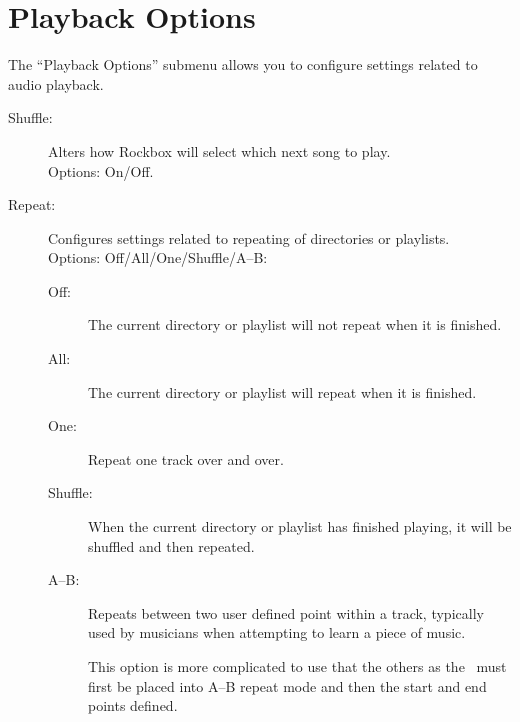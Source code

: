 \section{\label{ref:PlaybackOptions}Playback Options}
  The ``Playback Options'' submenu allows you to configure settings related to audio playback.
  \begin{description}
    \item[Shuffle: ]Alters how Rockbox will select which next song to play.\\
      Options: On/Off.
    \item[Repeat: ]Configures settings related to repeating of directories or playlists.\\
      Options: Off/All/One/Shuffle/A--B:
      \begin{description}
        \item[Off: ]The current directory or playlist will not repeat 
          when it is finished.
        \item[All: ]The current directory or playlist will repeat when it is finished.
        \item[One: ]Repeat one track over and over.
        \item[Shuffle: ]When the current directory or playlist has finished playing, it 
          will be shuffled and then repeated.
        \item[A--B: ]Repeats between two user defined point within a track, typically
          used by musicians when attempting to learn a piece of music.

          This option is more complicated to use that the others as the \dap\ must first be 
          placed into A--B repeat mode and then the start and end points defined.\\
      \end{description}


\end{description}
